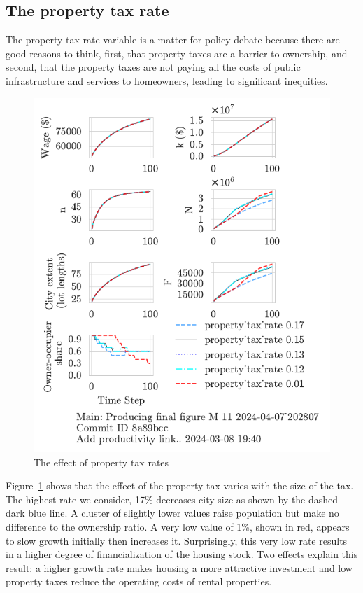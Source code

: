 \newpage



\subsection{The property tax rate}

The property tax rate variable is a matter for policy debate because there are good reasons to think, first, that property taxes are a barrier to ownership, and second, that the property taxes are not paying all the costs of public infrastructure and services to homeowners, leading to significant inequities.

\begin{figure}[h!b]
    \centering
    \includegraphics[scale=1.1, trim={0 1.4cm 0 0},clip]{fig/property_tax_with_5_202807.pdf}
    \caption{The effect of property tax rates}
    \label{fig:property_tax_ownership_trajectory}
\end{figure}

Figure~\ref{fig:property_tax_ownership_trajectory} shows that the effect of the property tax varies with the size of the tax. The highest rate we consider, 17\%  decreases city size as shown by the dashed dark blue line. A cluster of slightly lower values raise population but make no difference to the ownership ratio. A very low value of 1\%, shown in red, appears to slow growth initially then increases it.  Surprisingly, this very low rate results in a higher degree of financialization of the housing stock. Two effects explain this result: a higher growth rate makes housing a more attractive investment and low property taxes reduce the operating costs of rental properties. 

